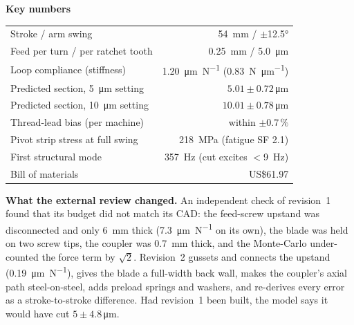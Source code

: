 \documentclass[10pt,a4paper]{article}
\begin{document}
\begin{minipage}[t]{0.49\linewidth}\vspace{0pt}
\textbf{Key numbers}\\[-8pt]
\begin{center}\small
\begin{tabularx}{\linewidth}{@{}Xr@{}}
\toprule
Stroke / arm swing & \SI{54}{\milli\metre} / $\pm$\ang{12.5} \\
Feed per turn / per ratchet tooth & \SI{0.25}{\milli\metre} / \SI{5.0}{\micro\metre} \\
Loop compliance (stiffness) & \SI{1.20}{\micro\metre\per\newton} (\SI{0.83}{\newton\per\micro\metre}) \\
Predicted section, \SI{5}{\micro\metre} setting & $5.01\pm0.72$\,\si{\micro\metre} \\
Predicted section, \SI{10}{\micro\metre} setting & $10.01\pm0.78$\,\si{\micro\metre} \\
Thread-lead bias (per machine) & within $\pm0.7\,\%$ \\
Pivot strip stress at full swing & \SI{218}{\mega\pascal} (fatigue SF 2.1) \\
First structural mode & \SI{357}{\hertz} (cut excites $<$\SI{9}{\hertz}) \\
Bill of materials & US\$61.97 \\
\bottomrule
\end{tabularx}
\end{center}
\textbf{What the external review changed.} An independent check of revision~1 found that its budget did not match its CAD: the feed-screw upstand was disconnected and only \SI{6}{\milli\metre} thick (\SI{7.3}{\micro\metre\per\newton} on its own), the blade was held on two screw tips, the coupler was \SI{0.7}{\milli\metre} thick, and the Monte-Carlo under-counted the force term by $\sqrt2$. Revision~2 gussets and connects the upstand (\SI{0.19}{\micro\metre\per\newton}), gives the blade a full-width back wall, makes the coupler's axial path steel-on-steel, adds preload springs and washers, and re-derives every error as a stroke-to-stroke difference. Had revision~1 been built, the model says it would have cut $5\pm4.8$\,\si{\micro\metre}.
\end{minipage}
\end{document}

